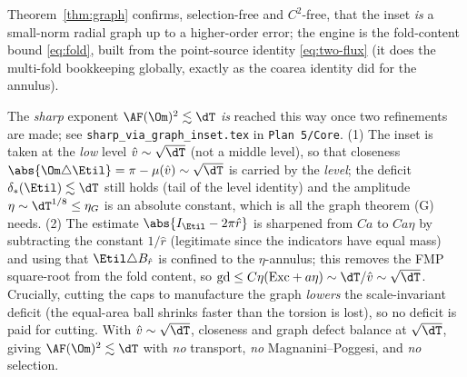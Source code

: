 \begin{remark}\label{rem:graph-status}
Theorem~\ref{thm:graph} confirms, selection-free and $C^2$-free, that the
inset \emph{is} a small-norm radial graph up to a higher-order error; the
engine is the fold-content bound \eqref{eq:fold}, built from the
point-source identity \eqref{eq:two-flux} (it does the multi-fold
bookkeeping globally, exactly as the coarea identity did for the annulus).

The \emph{sharp} exponent $\AF(\Om)^2\lesssim\dT$ \emph{is} reached this way
once two refinements are made; see \texttt{sharp\_via\_graph\_inset.tex} in
\texttt{Plan~5/Core}. (1) The inset is taken at the \emph{low} level
$\hat v\sim\sqrt\dT$ (not a middle level), so that closeness
$\abs{\Om\triangle\Etil}=\pi-\mu(\hat v)\sim\sqrt\dT$ is carried by the
\emph{level}; the deficit $\delta_*(\Etil)\lesssim\dT$ still holds (tail of the
level identity) and the amplitude $\eta\sim\dT^{1/8}\le\eta_G$ is an
absolute constant, which is all the graph theorem (G) needs. (2) The
estimate $\abs{I_\Etil-2\pi\hat r}$ is sharpened from $Ca$ to $Ca\eta$ by
subtracting the constant $1/\hat r$ (legitimate since the indicators have
equal mass) and using that $\Etil\triangle B_{\hat r}$ is confined to the
$\eta$-annulus; this removes the FMP square-root from the fold content, so
$\mathrm{gd}\le C\eta(\mathrm{Exc}+a\eta)\sim\dT/\hat v\sim\sqrt\dT$. Crucially, cutting the
caps to manufacture the graph \emph{lowers} the scale-invariant deficit
(the equal-area ball shrinks faster than the torsion is lost), so no
deficit is paid for cutting. With $\hat v\sim\sqrt\dT$, closeness and graph
defect balance at $\sqrt\dT$, giving $\AF(\Om)^2\lesssim\dT$ with \emph{no}
transport, \emph{no} Magnanini--Poggesi, and \emph{no} selection.
\end{remark}

